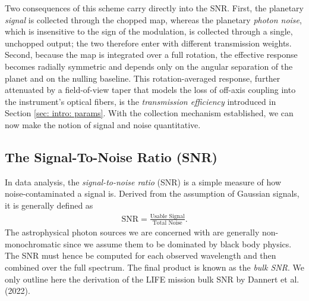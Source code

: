 \documentclass[12pt,a4paper]{article}
\numberwithin{equation}{section}
\numberwithin{figure}{section}
\numberwithin{table}{section}
\begin{document}
Two consequences of this scheme carry directly into the SNR. First, the planetary \textit{signal} is collected through the chopped map, whereas the planetary \textit{photon noise}, which is insensitive to the sign of the modulation, is collected through a single, unchopped output; the two therefore enter with different transmission weights. Second, because the map is integrated over a full rotation, the effective response becomes radially symmetric and depends only on the angular separation of the planet and on the nulling baseline. This rotation-averaged response, further attenuated by a field-of-view taper that models the loss of off-axis coupling into the instrument's optical fibers, is the \textit{transmission efficiency} introduced in Section \ref{sec: intro: params}. With the collection mechanism established, we can now make the notion of signal and noise quantitative.

\subsection{The Signal-To-Noise Ratio (SNR)}
In data analysis, the \textit{signal-to-noise ratio} (SNR) is a simple measure of how noise-contaminated a signal is. Derived from the assumption of Gaussian signals, it is generally defined as
\begin{align}
    \text{SNR} = \frac{\text{Usable Signal}}{\text{Total Noise}}.
\end{align}
The astrophysical photon sources we are concerned with are generally non-monochromatic since we assume them to be dominated by black body physics. The SNR must hence be computed for each observed wavelength and then combined over the full spectrum. The final product is known as the \textit{bulk SNR}. We only outline here the derivation of the LIFE mission bulk SNR by Dannert et al. (2022).
\end{document}
